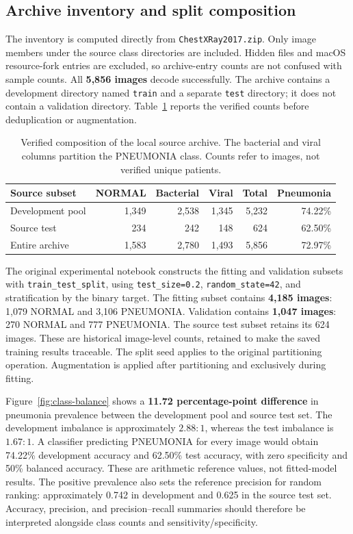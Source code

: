 \documentclass[12pt,letterpaper]{article}
\begin{document}
\subsection{Archive inventory and split composition}
The inventory is computed directly from \texttt{ChestXRay2017.zip}. Only image members under the source class directories are included. Hidden files and macOS resource-fork entries are excluded, so archive-entry counts are not confused with sample counts. All \textbf{5,856 images} decode successfully. The archive contains a development directory named \texttt{train} and a separate \texttt{test} directory; it does not contain a validation directory. Table~\ref{tab:source-counts} reports the verified counts before deduplication or augmentation.

\begin{table}[htbp]
\centering
\caption{Verified composition of the local source archive. The bacterial and viral columns partition the PNEUMONIA class. Counts refer to images, not verified unique patients.}
\label{tab:source-counts}
\small
\begin{tabular}{lrrrrr}
\toprule
Source subset & NORMAL & Bacterial & Viral & Total & Pneumonia \\
\midrule
Development pool & 1,349 & 2,538 & 1,345 & 5,232 & 74.22\% \\
Source test & 234 & 242 & 148 & 624 & 62.50\% \\
\midrule
Entire archive & 1,583 & 2,780 & 1,493 & 5,856 & 72.97\% \\
\bottomrule
\end{tabular}
\end{table}

The original experimental notebook constructs the fitting and validation subsets with \texttt{train\_test\_split}, using \texttt{test\_size=0.2}, \texttt{random\_state=42}, and stratification by the binary target. The fitting subset contains \textbf{4,185 images}: 1,079 NORMAL and 3,106 PNEUMONIA. Validation contains \textbf{1,047 images}: 270 NORMAL and 777 PNEUMONIA. The source test subset retains its 624 images. These are historical image-level counts, retained to make the saved training results traceable. The split seed applies to the original partitioning operation. Augmentation is applied after partitioning and exclusively during fitting.

Figure~\ref{fig:class-balance} shows a \textbf{11.72 percentage-point difference} in pneumonia prevalence between the development pool and source test set. The development imbalance is approximately $2.88{:}1$, whereas the test imbalance is $1.67{:}1$. A classifier predicting PNEUMONIA for every image would obtain 74.22\% development accuracy and 62.50\% test accuracy, with zero specificity and 50\% balanced accuracy. These are arithmetic reference values, not fitted-model results. The positive prevalence also sets the reference precision for random ranking: approximately 0.742 in development and 0.625 in the source test set. Accuracy, precision, and precision--recall summaries should therefore be interpreted alongside class counts and sensitivity/specificity.
\end{document}
